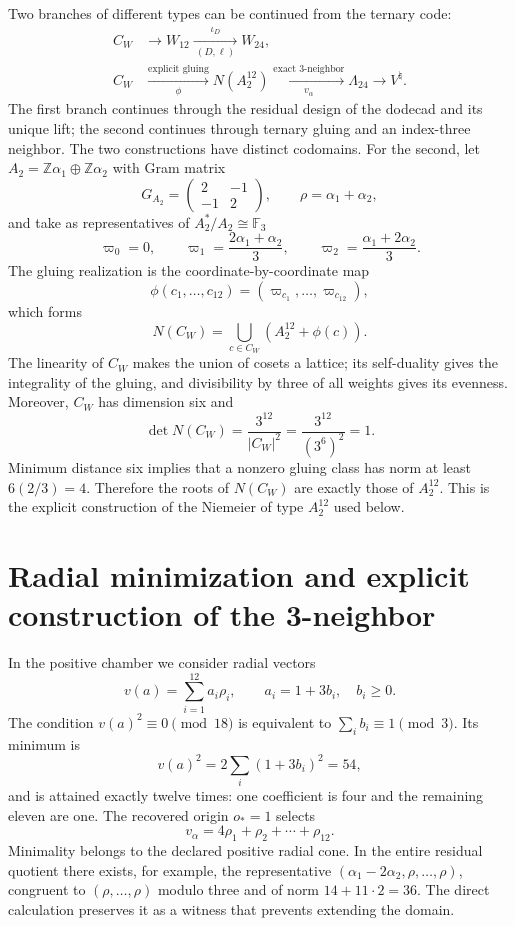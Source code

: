 Two branches of different types can be continued from the ternary code:
\[
\begin{aligned}
C_W&\longrightarrow W_{12}
\xrightarrow[\ (D,\ell)\ ]{\ \iota_D\ }W_{24},\\
C_W&\xrightarrow[\phi]{\text{explicit gluing}}N(A_2^{12})
\xrightarrow[v_\alpha]{\text{exact 3-neighbor}}\Lambda_{24}
\longrightarrow V^\natural .
\end{aligned}
\]
The first branch continues through the residual design of the dodecad and its
unique lift; the second continues through ternary gluing and an index-three
neighbor. The two constructions have distinct codomains. For the
second, let \(A_2=\mathbb Z\alpha_1\oplus\mathbb Z\alpha_2\) with Gram
matrix
\[
G_{A_2}=\begin{pmatrix}2&-1\\-1&2\end{pmatrix},
\qquad \rho=\alpha_1+\alpha_2,
\]
and take as representatives of \(A_2^*/A_2\cong\mathbb F_3\)
\[
\varpi_0=0,\qquad
\varpi_1=\frac{2\alpha_1+\alpha_2}{3},\qquad
\varpi_2=\frac{\alpha_1+2\alpha_2}{3}.
\]
The gluing realization is the coordinate-by-coordinate map
\[
\phi(c_1,\ldots,c_{12})=(\varpi_{c_1},\ldots,\varpi_{c_{12}}),
\]
which forms
\[
N(C_W)=\bigcup_{c\in C_W}(A_2^{12}+\phi(c)).
\]
The linearity of \(C_W\) makes the union of cosets a lattice; its
self-duality gives the integrality of the gluing, and divisibility by three of
all weights gives its evenness. Moreover, \(C_W\) has dimension six and
\[
\det N(C_W)=\frac{3^{12}}{|C_W|^2}
=\frac{3^{12}}{(3^6)^2}=1.
\]
Minimum distance six implies that a nonzero gluing class has norm
at least \(6(2/3)=4\). Therefore the roots of \(N(C_W)\) are exactly those
of \(A_2^{12}\). This is the explicit construction of the Niemeier of type
\(A_2^{12}\) used below.

\section{Radial minimization and explicit construction of the 3-neighbor}
\label{sec:vecino-leech-ejecutable}

In the positive chamber we consider radial vectors
\[
v(a)=\sum_{i=1}^{12}a_i\rho_i,
\qquad a_i=1+3b_i,\quad b_i\ge0.
\]
The condition \(v(a)^2\equiv0\pmod{18}\) is equivalent to
\(\sum_i b_i\equiv1\pmod3\). Its minimum is
\[
v(a)^2=2\sum_i(1+3b_i)^2=54,
\]
and is attained exactly twelve times: one coefficient is four and the remaining eleven
are one. The recovered origin \(o_*=1\) selects
\[
v_\alpha=4\rho_1+\rho_2+\cdots+\rho_{12}.
\]
Minimality belongs to the declared positive radial cone. In the entire
residual quotient there exists, for example, the representative
\((\alpha_1-2\alpha_2,\rho,\ldots,\rho)\), congruent to
\((\rho,\ldots,\rho)\) modulo three and of norm \(14+11\cdot2=36\). The
direct calculation preserves it as a witness that prevents extending the domain.

